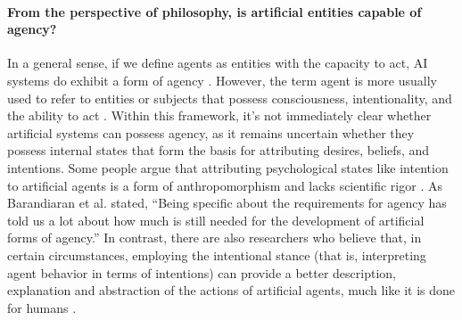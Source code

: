 \documentclass{article}
\begin{document}
\paragraph{From the perspective of philosophy, is artificial entities capable of agency?}
In a general sense, if we define agents as entities with the capacity to act, AI systems do exhibit a form of agency \cite{sep-agency}. 
However, the term agent is more usually used to refer to entities or subjects that possess consciousness, intentionality, and the ability to act \cite{anscombe2000intention,60a9dd9a-e48a-3fcf-87dd-d5c158406fc6,Davidson1971-DAVIA-2}. Within this framework, it's not immediately clear whether artificial systems can possess agency, as it remains uncertain whether they possess internal states that form the basis for attributing desires, beliefs, and intentions. 
Some people argue that attributing psychological states like intention to artificial agents is a form of anthropomorphism and lacks scientific rigor \cite{sep-agency,barandiaran2009defining}. 
As Barandiaran et al. \cite{barandiaran2009defining} stated, “Being specific about the requirements for agency has told us a lot about how much is still needed for the development of artificial forms of agency.”
In contrast, there are also researchers who believe that, in certain circumstances, employing the intentional stance (that is, interpreting agent behavior in terms of intentions) can provide a better description, explanation and abstraction of the actions of artificial agents, much like it is done for humans \cite{DBLP:conf/law/Shoham92,mccarthy1979ascribing,rosenschein1986synthesis}.

\end{document}
